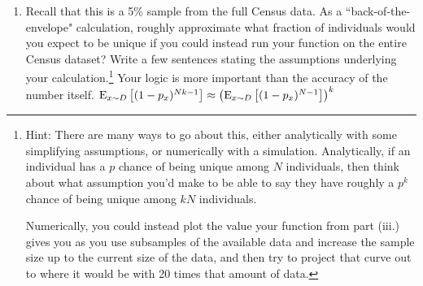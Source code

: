 \documentclass[11pt]{article}
\begin{document}
\begin{enumerate}[leftmargin=*]
\begin{enumerate}
\begin{enumerate}
        \item 
        Recall that this is a 5\% sample from the full Census data.   As a ``back-of-the-envelope" calculation, roughly approximate what fraction of individuals would you expect to be unique if you could instead run your function on the entire Census dataset? Write a few sentences stating the assumptions underlying your calculation.\footnote{Hint: There are many ways to go about this, either analytically with some simplifying assumptions, or numerically with a simulation.  Analytically, if an individual has a $p$ chance of being unique among $N$ individuals, then think about what assumption you'd make to be able to say they have roughly a $p^k$ chance of being unique among $kN$ individuals.  

        Numerically, you could instead plot the value your function from part (iii.) gives you as you use subsamples of the available data and increase the sample size up to the current size of the data, and then try to project that curve out to where it would be with 20 times that amount of data.}   Your logic is more important than the accuracy of the number itself.  
$\mathrm{E}_{x\sim D}\left[(1-p_x)^{Nk-1}\right]\approx \left(\mathrm{E}_{x\sim D}\left[(1-p_x)^{N-1}\right]\right)^k$ 

        
    \end{enumerate}
\end{enumerate}


\end{enumerate}
\iffalse
\begin{thebibliography}

\bibitem{CormenLeRiSt09} Cormen, Thomas H. and Leiserson, Charles E. and Rivest, Ronald L. and Stein, Clifford, ``Introduction to Algorithms, Third Edition", \emph{The MIT Press}, 2009.

\end{thebibliography}
\fi

\newpage
\vspace{-1cm}

\end{document}
